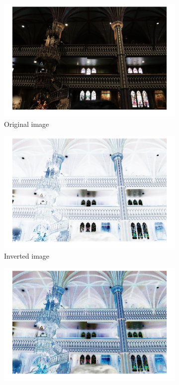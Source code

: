 \documentclass[conference]{IEEEtran}
\begin{document}
\begin{figure}[h!]
\centering
\begin{subfigure}[b]{0.4\linewidth}
\includegraphics[width=\linewidth]{images/img21.jpg}
\caption{Original image}
\end{subfigure}
\begin{subfigure}[b]{0.4\linewidth}
\includegraphics[width=\linewidth]{images/img22.jpg}
\caption{Inverted image}
\end{subfigure}
\begin{subfigure}[b]{0.4\linewidth}
\includegraphics[width=\linewidth]{images/img23.jpg}

\end{subfigure}
\end{figure}
\end{document}
